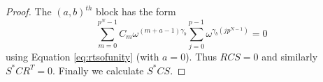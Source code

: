 \documentclass[preprint,12pt]{elsarticle}
\theoremstyle{definition}
\theoremstyle{remark}
\begin{document}
\begin{proof}
The $ (a,b)^{th} $ block has the form 
\[
 {\sum\limits_{m = 0}^{{p^N} - 1} {C_m}{\omega^{(m+a-1)\gamma_b}\sum\limits_{j=0}^{p-1}{\omega ^{\gamma _b(jp^{N-1})}}} } = 0 
 \]
using Equation \ref{eq:rtsofunity} (with $a=0$). Thus $RCS=0$ and similarly $S^*CR^T=0$. Finally we calculate $S^*CS$.

\end{proof}
\end{document}
